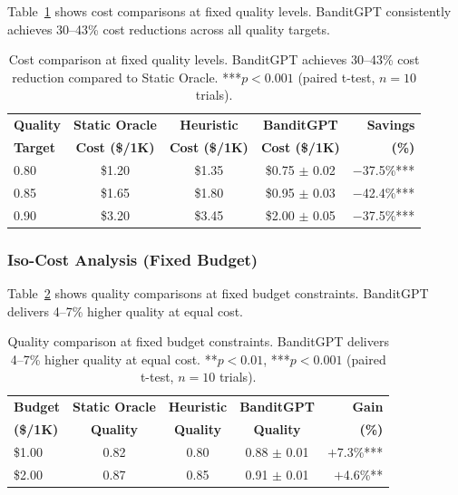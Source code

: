 Table~\ref{tab:iso_quality} shows cost comparisons at fixed quality levels. BanditGPT consistently achieves 30--43\% cost reductions across all quality targets.

\begin{table}[h]
\centering
\small
\begin{tabular}{@{}lcccr@{}}
\toprule
\textbf{Quality} & \textbf{Static Oracle} & \textbf{Heuristic} & \textbf{BanditGPT} & \textbf{Savings} \\ 
\textbf{Target} & \textbf{Cost (\$/1K)} & \textbf{Cost (\$/1K)} & \textbf{Cost (\$/1K)} & \textbf{(\%)} \\ \midrule
0.80 & \$1.20 & \$1.35 & \$0.75 $\pm$ 0.02 & $-$37.5\%*** \\
0.85 & \$1.65 & \$1.80 & \$0.95 $\pm$ 0.03 & $-$42.4\%*** \\
0.90 & \$3.20 & \$3.45 & \$2.00 $\pm$ 0.05 & $-$37.5\%*** \\
\bottomrule
\end{tabular}
\caption{%
    Cost comparison at fixed quality levels. 
    BanditGPT achieves 30--43\% cost reduction compared to Static Oracle. 
    ***$p < 0.001$ (paired t-test, $n=10$ trials).
}
\label{tab:iso_quality}
\end{table}

\subsubsection{Iso-Cost Analysis (Fixed Budget)}

Table~\ref{tab:iso_cost} shows quality comparisons at fixed budget constraints. BanditGPT delivers 4--7\% higher quality at equal cost.

\begin{table}[h]
\centering
\small
\begin{tabular}{@{}lcccr@{}}
\toprule
\textbf{Budget} & \textbf{Static Oracle} & \textbf{Heuristic} & \textbf{BanditGPT} & \textbf{Gain} \\ 
\textbf{(\$/1K)} & \textbf{Quality} & \textbf{Quality} & \textbf{Quality} & \textbf{(\%)} \\ \midrule
\$1.00 & 0.82 & 0.80 & 0.88 $\pm$ 0.01 & $+$7.3\%*** \\
\$2.00 & 0.87 & 0.85 & 0.91 $\pm$ 0.01 & $+$4.6\%** \\
\bottomrule
\end{tabular}
\caption{%
    Quality comparison at fixed budget constraints. 
    BanditGPT delivers 4--7\% higher quality at equal cost. 
    **$p < 0.01$, ***$p < 0.001$ (paired t-test, $n=10$ trials).
}
\label{tab:iso_cost}
\end{table}

